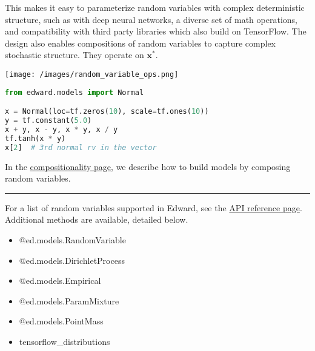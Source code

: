 This makes it easy to parameterize random variables with complex
deterministic structure, such as with deep neural networks, a diverse
set of math operations, and compatibility with third party libraries
which also build on TensorFlow.
The design also enables compositions of random variables
to capture complex stochastic structure.
They operate on $\mathbf{x}^*$.

\texttt{[image: /images/random\_variable\_ops.png]}

\begin{lstlisting}[language=Python]
from edward.models import Normal

x = Normal(loc=tf.zeros(10), scale=tf.ones(10))
y = tf.constant(5.0)
x + y, x - y, x * y, x / y
tf.tanh(x * y)
x[2]  # 3rd normal rv in the vector
\end{lstlisting}

In the \href{/api/model-compositionality}{compositionality page}, we
describe how to build models by composing random variables.

\begin{center}\rule{3in}{0.4pt}\end{center}

For a list of random variables supported in Edward, see the
\href{/api/reference}{API reference page}.
Additional methods are available, detailed below.

\begin{itemize}
  \item @{ed.models.RandomVariable}
  \item @{ed.models.DirichletProcess}
  \item @{ed.models.Empirical}
  \item @{ed.models.ParamMixture}
  \item @{ed.models.PointMass}
  \item {{tensorflow_distributions}}
\end{itemize}
